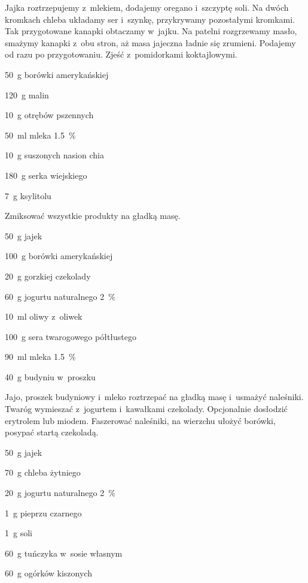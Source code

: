 \documentclass[../kucharek.tex]{subfiles}
\begin{document}
Jajka roztrzepujemy z~mlekiem, dodajemy oregano i~szczyptę soli. Na dwóch
kromkach chleba układamy ser i~szynkę, przykrywamy pozostałymi kromkami. Tak
przygotowane kanapki obtaczamy w~jajku. Na patelni rozgrzewamy masło, smażymy
kanapki z~obu stron, aż masa jajeczna ładnie się zrumieni. Podajemy od razu po
przygotowaniu. Zjeść z~pomidorkami koktajlowymi.


\begin{Ingred}
    \item \qty{50}{\gram} borówki amerykańskiej
    \item \qty{120}{\gram} malin
    \item \qty{10}{\gram} otrębów pszennych
    \item \qty{50}{\milli\litre} mleka \qty{1.5}{\percent}
    \item \qty{10}{\gram} suszonych nasion chia
    \item \qty{180}{\gram} serka wiejskiego
    \item \qty{7}{\gram} ksylitolu
\end{Ingred}

Zmiksować wszystkie produkty na gładką masę.


\begin{Ingred}
    \item \qty{50}{\gram} jajek
    \item \qty{100}{\gram} borówki amerykańskiej
    \item \qty{20}{\gram} gorzkiej czekolady
    \item \qty{60}{\gram} jogurtu naturalnego \qty{2}{\percent}
    \item \qty{10}{\milli\litre} oliwy z~oliwek
    \item \qty{100}{\gram} sera twarogowego półtłustego
    \item \qty{90}{\milli\litre} mleka \qty{1.5}{\percent}
    \item \qty{40}{\gram} budyniu w~proszku
\end{Ingred}

Jajo, proszek budyniowy i~mleko roztrzepać na gładką masę i~usmażyć naleśniki.
Twaróg wymieszać z~jogurtem i~kawałkami czekolady. Opcjonalnie dosłodzić
erytrolem lub miodem. Faszerować naleśniki, na wierzchu ułożyć borówki, posypać
startą czekoladą.

\begin{Ingred}
    \item \qty{50}{\gram} jajek
    \item \qty{70}{\gram} chleba żytniego
    \item \qty{20}{\gram} jogurtu naturalnego \qty{2}{\percent}
    \item \qty{1}{\gram} pieprzu czarnego
    \item \qty{1}{\gram} soli
    \item \qty{60}{\gram} tuńczyka w~sosie własnym
    \item \qty{60}{\gram} ogórków kiszonych
\end{Ingred}
\end{document}
